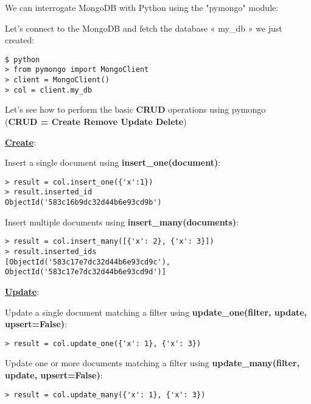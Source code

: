 \documentclass{beamer}[10pt, usepdftitle=false handout]
\begin{document}
	\begin{frame}[fragile]
	
We can interrogate MongoDB with Python using the "pymongo" module:
\vspace*{0.6em}

Let's connect to the MongoDB and fetch the database « my\_db » we just created:
\vspace*{0.6em}

\begin{verbatim}
$ python
> from pymongo import MongoClient
> client = MongoClient()
> col = client.my_db
\end{verbatim}
	
	\end{frame}
\begin{frame}[fragile]
Let's see how to perform the basic \textbf{CRUD} operations using pymongo \\
(\textbf{CRUD = Create Remove Update Delete})
\vspace*{0.6em}

\underline{\textbf{Create}}:
\vspace*{0.6em}

Insert a single document using \textbf{insert\_one(document)}:
\begin{verbatim}
> result = col.insert_one({'x':1})
> result.inserted_id
ObjectId('583c16b9dc32d44b6e93cd9b')
\end{verbatim}
 
Insert multiple documents using \textbf{insert\_many(documents)}:
\begin{verbatim}
> result = col.insert_many([{'x': 2}, {'x': 3}])
> result.inserted_ids
[ObjectId('583c17e7dc32d44b6e93cd9c'), 
ObjectId('583c17e7dc32d44b6e93cd9d')]
\end{verbatim}
\end{frame}
\begin{frame}[fragile]
\underline{\textbf{Update}}:
\vspace*{0.6em}

Update a single document matching a filter using \textbf{update\_one(filter, update, upsert=False)}:
\begin{verbatim}
> result = col.update_one({'x': 1}, {'x': 3})
\end{verbatim}
 
Update one or more documents matching a filter using \textbf{update\_many(filter, update, upsert=False)}:
\begin{verbatim}
> result = col.update_many({'x': 1}, {'x': 3})
\end{verbatim}

\end{frame}
\end{document}
